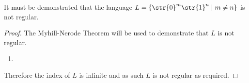 It must be demonstrated that the language $L = \{ \str{0}^m\str{1}^n \mid m \neq n \}$ is not regular.
\begin{proof}
The Myhill-Nerode Theorem will be used to demonstrate that $L$ is not regular.
	\begin{enumerate}[label=\Roman*.]
		\item 
	\end{enumerate}
	Therefore the index of $L$ is infinite and as such $L$ is not regular as required.
\end{proof}